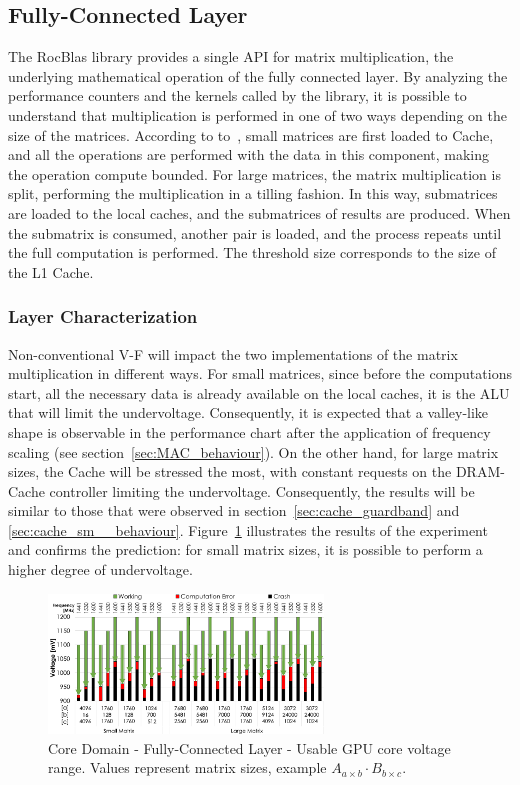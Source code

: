 \subsection{Fully-Connected Layer}


The RocBlas library provides a single API for matrix multiplication, the underlying mathematical operation of the fully connected layer. By analyzing the performance counters and the kernels called by the library, it is possible to understand that multiplication is performed in one of two ways depending on the size of the matrices.
According to to~\cite{dutot_high-performance_2016}, small matrices are first loaded to Cache, and all the operations are performed with the data in this component, making the operation compute bounded. For large matrices, the matrix multiplication is split, performing the multiplication in a tilling fashion. In this way, submatrices are loaded to the local caches, and the submatrices of results are produced. When the submatrix is consumed, another pair is loaded, and the process repeats until the full computation is performed. The threshold size corresponds to the size of the L1 Cache. 


\subsubsection{Layer Characterization}

Non-conventional V-F will impact the two implementations of the matrix multiplication in different ways. For small matrices, 
since before the computations start, all the necessary data is already available on the local caches, 
it is the ALU that will limit the undervoltage. Consequently, it is expected that a valley-like shape is observable in the performance chart after the application of frequency scaling (see section~\ref{sec:MAC_behaviour}). On the other hand, for large matrix sizes, the Cache will be stressed the most, with constant requests on the DRAM-Cache controller limiting the undervoltage. Consequently, the results will be similar to those that were observed in section~\ref{sec:cache_guardband} and \ref{sec:cache_sm__behaviour}. Figure~\ref{fig:MatrixMult_guardband} illustrates the results of the experiment and confirms the prediction: for small matrix sizes, it is possible to perform a higher degree of undervoltage. 


\begin{figure}[htbp]
    \centering
        \includegraphics[width=0.65\textwidth]{Figures/Application To Deep Learning/MatrixMul_guardband.pdf}
        \caption{Core Domain - Fully-Connected Layer - Usable GPU core voltage range. Values represent matrix sizes, example $A_{a \times b} \cdot B_{b \times c}$.}
    \label{fig:MatrixMult_guardband}
\end{figure}


